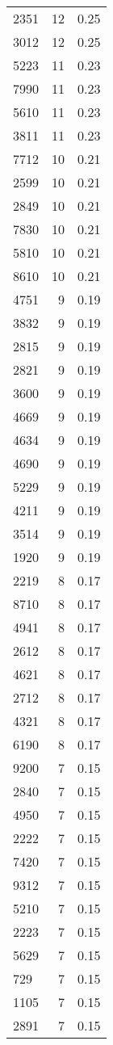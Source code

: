 \begin{table*}[htbp]
\begin{tabular}{lrr}
2351 & 12 & 0.25 \\
3012 & 12 & 0.25 \\
5223 & 11 & 0.23 \\
7990 & 11 & 0.23 \\
5610 & 11 & 0.23 \\
3811 & 11 & 0.23 \\
7712 & 10 & 0.21 \\
2599 & 10 & 0.21 \\
2849 & 10 & 0.21 \\
7830 & 10 & 0.21 \\
5810 & 10 & 0.21 \\
8610 & 10 & 0.21 \\
4751 & 9 & 0.19 \\
3832 & 9 & 0.19 \\
2815 & 9 & 0.19 \\
2821 & 9 & 0.19 \\
3600 & 9 & 0.19 \\
4669 & 9 & 0.19 \\
4634 & 9 & 0.19 \\
4690 & 9 & 0.19 \\
5229 & 9 & 0.19 \\
4211 & 9 & 0.19 \\
3514 & 9 & 0.19 \\
1920 & 9 & 0.19 \\
2219 & 8 & 0.17 \\
8710 & 8 & 0.17 \\
4941 & 8 & 0.17 \\
2612 & 8 & 0.17 \\
4621 & 8 & 0.17 \\
2712 & 8 & 0.17 \\
4321 & 8 & 0.17 \\
6190 & 8 & 0.17 \\
9200 & 7 & 0.15 \\
2840 & 7 & 0.15 \\
4950 & 7 & 0.15 \\
2222 & 7 & 0.15 \\
7420 & 7 & 0.15 \\
9312 & 7 & 0.15 \\
5210 & 7 & 0.15 \\
2223 & 7 & 0.15 \\
5629 & 7 & 0.15 \\
729 & 7 & 0.15 \\
1105 & 7 & 0.15 \\
2891 & 7 & 0.15 \\

\end{tabular}
\end{table*}
